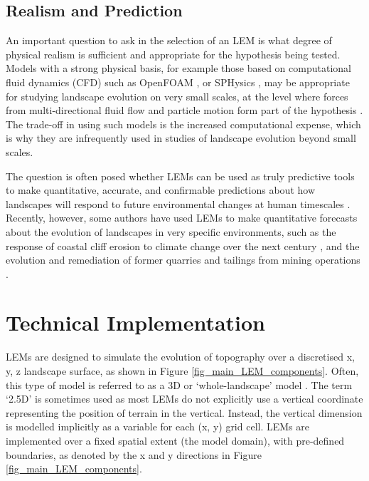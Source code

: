 \subsection{Realism and Prediction}

An important question to ask in the selection of an LEM is what degree of physical realism is sufficient and appropriate for the hypothesis being tested. Models with a strong physical basis, for example those based on computational fluid dynamics (CFD) such as OpenFOAM \citep{Jasak2007}, or SPHysics \citep{Gomez-Gesteira2012}, may be appropriate for studying landscape evolution on very small scales, at the level where forces from multi-directional fluid flow and particle motion form part of the hypothesis \citep[e.g.][]{Bates1998,Jackson2015}. The trade-off in using such models is the increased computational expense, which is why they are infrequently used in studies of landscape evolution beyond small scales.

The question is often posed whether LEMs can be used as truly predictive tools to make quantitative, accurate, and confirmable predictions about how landscapes will respond to future environmental changes at human timescales \citep{hooke2003predictive,pelletier2015forecasting}. Recently, however, some authors have used LEMs to make quantitative forecasts about the evolution of landscapes in very specific environments, such as the response of coastal cliff erosion to climate change over the next century \citep{Hackney2013}, and the evolution and remediation of former quarries and tailings from mining operations \citep{Hancock2004,Hancock2015}.

\section{Technical Implementation}
\label{sec_technical}
LEMs are designed to simulate the evolution of topography over a discretised x, y, z landscape surface, as shown in Figure \ref{fig_main_LEM_components}. Often, this type of model is referred to as a 3D or `whole-landscape' model \citep{Willgoose2005}. The term `2.5D' is sometimes used as most LEMs do not explicitly use a vertical coordinate representing the position of terrain in the vertical. Instead, the vertical dimension is modelled implicitly as a variable for each (x, y) grid cell. LEMs are implemented over a fixed spatial extent (the model domain), with pre-defined boundaries, as denoted by the x and y directions in Figure \ref{fig_main_LEM_components}. 

